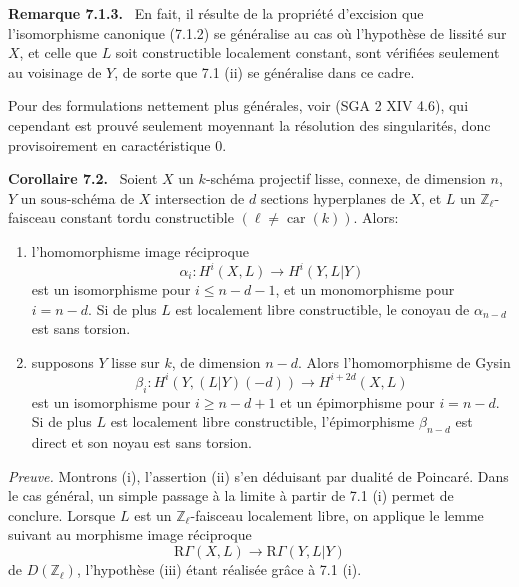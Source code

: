 \documentclass[11pt]{article}
\newenvironment{statement}[1]{\par\medskip\noindent\textbf{#1.}\ }{\par\medskip}
\newcommand{\R}{\mathrm{R}}\newcommand{\RHomCore}{\mathrm{RHom}}
\providecommand{\R}{\mathrm R}
\begin{document}
\begin{statement}{Remarque 7.1.3}
En fait, il résulte de la propriété d'excision que l'isomorphisme canonique (7.1.2) se généralise au cas où l'hypothèse de lissité sur $X$, et celle que $L$ soit constructible localement constant, sont vérifiées seulement au voisinage de $Y$, de sorte que 7.1 (ii) se généralise dans ce cadre.

Pour des formulations nettement plus générales, voir (SGA 2 XIV 4.6), qui cependant est prouvé seulement moyennant la résolution des singularités, donc provisoirement en caractéristique $0$.
\end{statement}

\begin{statement}{Corollaire 7.2}
Soient $X$ un $k$-schéma projectif lisse, connexe, de dimension $n$, $Y$ un sous-schéma de $X$ intersection de $d$ sections hyperplanes de $X$, et $L$ un $\mathbb Z_\ell$-faisceau constant tordu constructible $(\ell\ne\operatorname{car}(k))$. Alors:
\begin{enumerate}[label=(\roman*)]
\item l'homomorphisme image réciproque
\[
\alpha_i:H^i(X,L)\to H^i(Y,L|Y)
\]
est un isomorphisme pour $i\le n-d-1$, et un monomorphisme pour $i=n-d$. Si de plus $L$ est localement libre constructible, le conoyau de $\alpha_{n-d}$ est sans torsion.
\item supposons $Y$ lisse sur $k$, de dimension $n-d$. Alors l'homomorphisme de Gysin
\[
\beta_i:H^i(Y,(L|Y)(-d))\to H^{i+2d}(X,L)
\]
est un isomorphisme pour $i\ge n-d+1$ et un épimorphisme pour $i=n-d$. Si de plus $L$ est localement libre constructible, l'épimorphisme $\beta_{n-d}$ est direct et son noyau est sans torsion.
\end{enumerate}
\end{statement}

\emph{Preuve.} Montrons (i), l'assertion (ii) s'en déduisant par dualité de Poincaré. Dans le cas général, un simple passage à la limite à partir de 7.1 (i) permet de conclure. Lorsque $L$ est un $\mathbb Z_\ell$-faisceau localement libre, on applique le lemme suivant au morphisme image réciproque
\[
\R\Gamma(X,L)\to \R\Gamma(Y,L|Y)
\]
de $D(\mathbb Z_\ell)$, l'hypothèse (iii) étant réalisée grâce à 7.1 (i).
\end{document}
